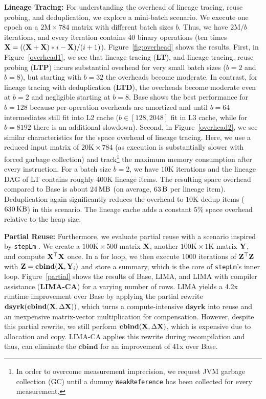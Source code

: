 \textbf{Lineage Tracing:} For understanding the overhead of lineage tracing, reuse probing, and deduplication, we explore a mini-batch scenario. We execute one epoch on a $2\text{M} \times 784$ matrix with different batch sizes $b$. Thus, we have $2\text{M}/b$ iterations, and every iteration contains 40 binary operations (ten times $\mathbf{X} = ((\mathbf{X} + \mathbf{X}) * i - \mathbf{X}) / (i+1)$). Figure~\ref{fig:overhead} shows the results. 
%
First, in Figure~\ref{overhead1}, we see that lineage tracing (\textbf{LT}), and lineage tracing, reuse probing (\textbf{LTP}) incurs substantial overhead for very small batch sizes ($b=2$ and $b=8$), but starting with $b=32$ the overheads become moderate. In contrast, for lineage tracing with deduplication (\textbf{LTD}), the overheads become moderate even at $b=2$ and negligible starting at $b=8$. Base shows the best performance for $b=128$ because per-operation overheads are amortized and until $b=64$ intermediates still fit into L2 cache ($b\in[128,\num{2048}]$ fit in L3 cache, while for $b=\num{8192}$ there is an additional slowdown).
%
Second, in Figure~\ref{overhead2}, we see similar characteristics for the space overhead of lineage tracing. Here, we use a reduced input matrix of $20\text{K} \times 784$ (as execution is substantially slower with forced garbage collection) and track\footnote{In order to overcome measurement imprecision, we request JVM garbage collection (GC) until a dummy \texttt{WeakReference} has been collected for every measurement.} the maximum memory consumption after every instruction. For a batch size $b=2$, we have $10\text{K}$ iterations and the lineage DAG of LT contains roughly $400\text{K}$ lineage items. The resulting space overhead compared to Base is about $24\mb$ (on average, $63\bb$ per lineage item). Deduplication again significantly reduces the overhead to $10\text{K}$ dedup items ($630\kb$) in this scenario. The lineage cache adds a constant $5\%$ space overhead relative to the heap size.

\textbf{Partial Reuse:} Furthermore, we evaluate partial reuse with a scenario inspired by \texttt{stepLm} \cite{VenablesR02}. We create a $100\text{K} \times 500$ matrix $\mathbf{X}$, another $100\text{K} \times 1\text{K}$ matrix $\mathbf{Y}$, and compute $\mathbf{X}^{\top}\mathbf{X}$ once. In a for loop, we then execute \num{1000} iterations of $\mathbf{Z}^{\top}\mathbf{Z}$ with $\mathbf{Z} = \textbf{cbind}(\mathbf{X}, \mathbf{Y}_i)$ and store a summary, which is the core of \texttt{stepLm}'s inner loop. Figure~\ref{partial} shows the results of Base, LIMA, and LIMA with compiler assistance (\textbf{LIMA-CA}) for a varying number of rows. LIMA yields a 4.2x runtime improvement over Base by applying the partial rewrite $\textbf{dsyrk}(\textbf{cbind}(\mathbf{X},\Delta\mathbf{X}))$, which turns a compute-intensive $\textbf{dsyrk}$ into reuse and an inexpensive matrix-vector multiplication for compensation. However, despite this partial rewrite, we still perform $\textbf{cbind}(\mathbf{X},\Delta\mathbf{X})$, which is expensive due to allocation and copy. LIMA-CA applies this rewrite during recompilation and thus, can eliminate the $\textbf{cbind}$ for an improvement of 41x over Base.


